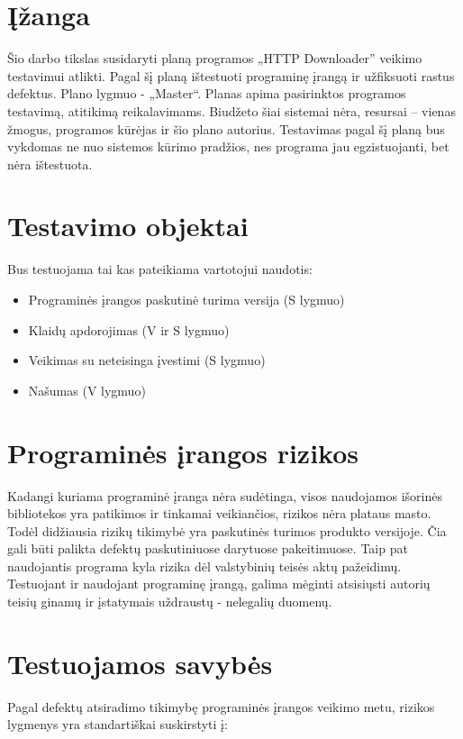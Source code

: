 \section{Įžanga}

Šio darbo tikslas susidaryti planą programos „HTTP Downloader” veikimo testavimui atlikti. 
Pagal šį planą ištestuoti programinę įrangą ir užfiksuoti rastus defektus. 
Plano lygmuo - „Master“. Planas apima pasirinktos programos testavimą, atitikimą reikalavimams. 
Biudžeto šiai sistemai nėra, resursai – vienas žmogus, programos kūrėjas ir šio plano autorius. 
Testavimas pagal šį planą bus vykdomas ne nuo sistemos kūrimo pradžios, nes programa jau egzistuojanti, bet nėra ištestuota. 

\section{Testavimo objektai}

Bus testuojama tai kas pateikiama vartotojui naudotis:

\begin{itemize}
	\item Programinės įrangos paskutinė turima versija (S lygmuo)
	\item Klaidų apdorojimas (V ir S lygmuo)
	\item Veikimas su neteisinga įvestimi (S lygmuo)
	\item Našumas (V lygmuo)
\end{itemize}

\section{Programinės įrangos rizikos}

Kadangi kuriama programinė įranga nėra sudėtinga, visos naudojamos išorinės bibliotekos yra patikimos ir tinkamai veikiančios, rizikos nėra plataus masto. 
Todėl didžiausia rizikų tikimybė yra paskutinės turimos produkto versijoje. 
Čia gali būti palikta defektų paskutiniuose darytuose pakeitimuose. 
Taip pat naudojantis programa kyla rizika dėl valstybinių teisės aktų pažeidimų. 
Testuojant ir naudojant programinę įrangą, galima mėginti atsisiųsti autorių teisių ginamų ir įstatymais uždraustų - nelegalių duomenų.

\section{Testuojamos savybės}

Pagal defektų atsiradimo tikimybę programinės įrangos veikimo metu, rizikos lygmenys yra standartiškai suskirstyti į:

